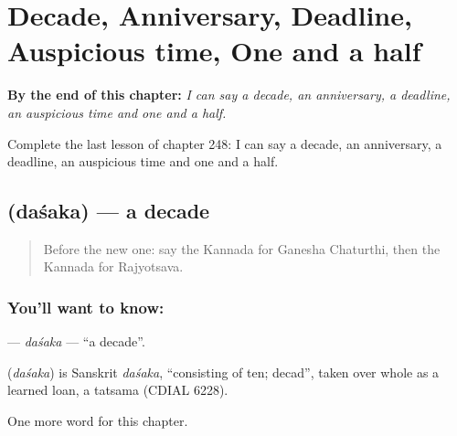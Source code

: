
\chapter{Decade, Anniversary, Deadline, Auspicious time, One and a half}
\label{ch:ka-decade-anniversary-deadline-auspicious-time-one-and-a-half}

\begin{chapteropening}
\textbf{By the end of this chapter:} \emph{I can say a decade, an anniversary, a deadline, an auspicious time and one and a half.}

Complete the last lesson of chapter 248: I can say a decade, an anniversary, a deadline, an auspicious time and one and a half.
\end{chapteropening}

\section[\texorpdfstring{\kn{ದಶಕ} (daśaka)}{ದಶಕ (daśaka)}]{ (daśaka) — a decade}

\label{lesson:KA-C248-dasaka}



\begin{quote}
Before the new one: say the Kannada for Ganesha Chaturthi, then the Kannada for Rajyotsava.
\end{quote}

\subsection*{You'll want to know: }
\textbf{} — \emph{daśaka} — \textquotedblleft{}a decade\textquotedblright{}.

\begin{cousinweb}
\textbf{} (\emph{daśaka}) is Sanskrit \emph{daśaka}, \textquotedblleft{}consisting of ten; decad\textquotedblright{}, taken over whole as a learned loan, a tatsama (CDIAL 6228).
\end{cousinweb}

\begin{grammarlens}[title={What you've built}]
One more word for this chapter.
\end{grammarlens}

